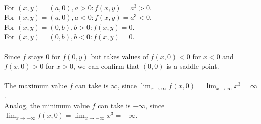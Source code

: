 \documentclass{article}
\begin{document}
\\
For $(x, y) = (a, 0), a > 0: f(x, y) = a^3 > 0$.\\
For $(x, y) = (a, 0), a < 0: f(x, y) = a^3 < 0$.\\
For $(x, y) = (0, b), b > 0: f(x, y) = 0$.\\
For $(x, y) = (0, b), b < 0: f(x, y) = 0$.\\
\\
Since $f$ stays 0 for $f(0, y)$ but takes values of $f(x, 0) < 0$ for $x < 0$ and $f(x, 0) > 0$ for $x > 0$, we can confirm that $(0, 0)$ is a saddle point.\\
\\
The maximum value $f$ can take is $\infty$, since $\lim_{x\to \infty} f(x, 0) =\lim_{x\to \infty} x^3 = \infty$.\\
Analog, the minimum value $f$ can take is $-\infty$, since $\lim_{x\to -\infty} f(x, 0) =\lim_{x\to -\infty} x^3 = -\infty$.
\end{document}
